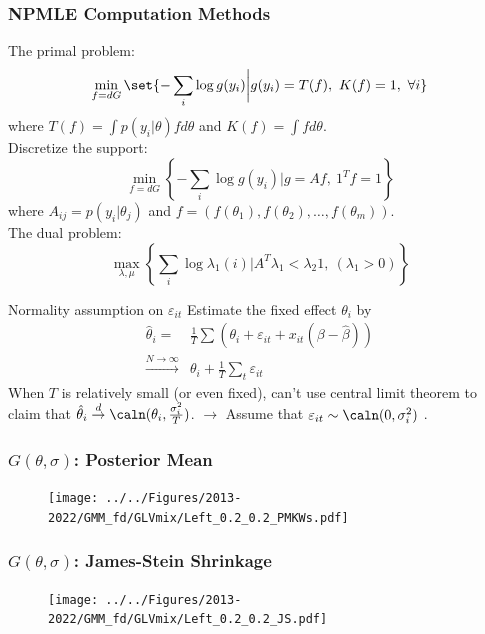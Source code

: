 \documentclass[10pt,mathserif,aspectratio=169]{beamer}
\begin{document}
\begin{frame}
  \frametitle{NPMLE Computation Methods}

  The primal problem:
  \begin{equation*}
    \min_{f=dG}\set{-\sum_i \log g(y_i)\bigg |g(y_i) = T(f),\ K(f)=1,\ \forall i }
  \end{equation*}
  where $ T(f)=\int p(y_i |\theta)fd\theta $ and  $K(f)= \int f d\theta$.\\
  Discretize the support:
  \begin{equation*}
    \min_{f=dG}\left\{-\sum_i \log g(y_i)\bigg |g=Af,\ {1^T}f=1\right\}
  \end{equation*}
  where $A_{ij}= p(y_i|\theta_j) $ and $ f = (f(\theta_1),f(\theta_2),\ldots,f(\theta_m))$.\\
  The dual problem:
  \begin{equation*}
    \max_{\lambda,\mu} \left\{ \sum_i \log \lambda_1(i) \bigg| A^T\lambda_1 < \lambda_2 1,\ (\lambda_1>0) \right\}
  \end{equation*}
\end{frame}

\begin{frame}[label=normality]{Normality assumption on $\varepsilon_{it}$}
  Estimate the fixed effect $\theta_i$ by
  \begin{align*}
    \hat{\theta}_i =                       & \frac{1}{T}\sum(\theta_i+\varepsilon_{it}+x_{it}(\beta-\hat{\beta})) \\
    \overset{N\to \infty}{\longrightarrow} & \theta_i+\frac{1}{T}\sum_t \varepsilon_{it}
  \end{align*}
  When $T$ is relatively small (or even fixed), can't use central limit theorem to claim that $\hat{\theta}_i \overset{d}{\to} \caln(\theta_i,\frac{\sigma_i^2}{T})$.
  $\longrightarrow$ Assume that $\varepsilon_{it} \sim \caln(0,\sigma_i^2)$ .
  \hyperlink{observation}{}   \hyperlink{limitation}{}
\end{frame}

\begin{frame}
  \frametitle{$G(\theta,\sigma)$: Posterior Mean}
  \begin{figure}
    \centering
    \texttt{[image: ../../Figures/2013-2022/GMM\_fd/GLVmix/Left\_0.2\_0.2\_PMKWs.pdf]}
  \end{figure}
\end{frame}

\begin{frame}
  \frametitle{$G(\theta,\sigma)$: James-Stein Shrinkage}
  \begin{figure}
    \centering
    \texttt{[image: ../../Figures/2013-2022/GMM\_fd/GLVmix/Left\_0.2\_0.2\_JS.pdf]}
  \end{figure}
\end{frame}
\end{document}
